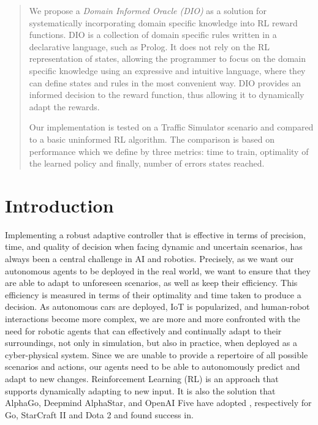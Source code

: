 \documentclass[a4paper,11pt]{article}
\theoremstyle{definition}
\begin{document}
\begin{abstract}

  We propose a \emph{Domain Informed Oracle (DIO)} as a solution for
  systematically incorporating domain specific knowledge into RL
  reward functions.
  DIO is a collection of domain specific rules written in a
  declarative language, such as Prolog.
  It does not rely on the RL representation of states, allowing the
  programmer to focus on the domain specific knowledge using an
  expressive and intuitive language, where they can define states and
  rules in the most convenient way.
  DIO provides an informed decision to the reward function, thus
  allowing it to dynamically adapt the rewards. 
  
  Our implementation is tested on a Traffic Simulator scenario and
  compared to a basic uninformed RL algorithm. 
  The comparison is based on performance which we define by three
  metrics: time to train, optimality of the learned policy and
  finally, number of errors states reached. 
  
\end{abstract}



\section{Introduction}

Implementing a robust adaptive controller that is effective in terms
of precision, time, and quality of decision
when facing dynamic and uncertain scenarios, has always been a central
challenge in AI and robotics. Precisely, as we want our autonomous agents to be deployed 
in the real world, we want to ensure that they are able to adapt to unforeseen scenarios, as well as 
keep their efficiency. This efficiency is measured in terms of their optimality and time taken to produce a decision. 
%
As autonomous cars are deployed, IoT is popularized, and human-robot interactions become more complex, we
are more and more confronted with the need for robotic agents that can effectively and continually adapt
to their surroundings, not only in simulation, but also in practice, when deployed as a cyber-physical system. 
Since we are unable to provide a repertoire of all possible scenarios and actions,
our agents need to be able to autonomously predict and adapt to new
changes. Reinforcement Learning (RL) is an approach that
supports dynamically adapting to new input. It is also the solution that AlphaGo, Deepmind AlphaStar, and OpenAI Five have
adopted \cite{li2019reinforcement}, respectively for Go, StarCraft II and Dota 2 and found success in. 
\end{document}
